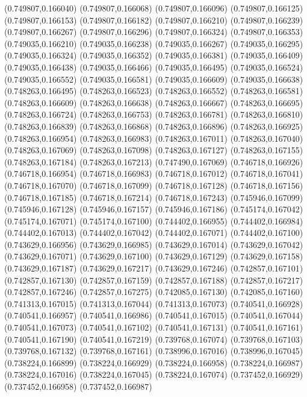 (0.749807,0.166040)
(0.749807,0.166068)
(0.749807,0.166096)
(0.749807,0.166125)
(0.749807,0.166153)
(0.749807,0.166182)
(0.749807,0.166210)
(0.749807,0.166239)
(0.749807,0.166267)
(0.749807,0.166296)
(0.749807,0.166324)
(0.749807,0.166353)
(0.749035,0.166210)
(0.749035,0.166238)
(0.749035,0.166267)
(0.749035,0.166295)
(0.749035,0.166324)
(0.749035,0.166352)
(0.749035,0.166381)
(0.749035,0.166409)
(0.749035,0.166438)
(0.749035,0.166466)
(0.749035,0.166495)
(0.749035,0.166524)
(0.749035,0.166552)
(0.749035,0.166581)
(0.749035,0.166609)
(0.749035,0.166638)
(0.748263,0.166495)
(0.748263,0.166523)
(0.748263,0.166552)
(0.748263,0.166581)
(0.748263,0.166609)
(0.748263,0.166638)
(0.748263,0.166667)
(0.748263,0.166695)
(0.748263,0.166724)
(0.748263,0.166753)
(0.748263,0.166781)
(0.748263,0.166810)
(0.748263,0.166839)
(0.748263,0.166868)
(0.748263,0.166896)
(0.748263,0.166925)
(0.748263,0.166954)
(0.748263,0.166983)
(0.748263,0.167011)
(0.748263,0.167040)
(0.748263,0.167069)
(0.748263,0.167098)
(0.748263,0.167127)
(0.748263,0.167155)
(0.748263,0.167184)
(0.748263,0.167213)
(0.747490,0.167069)
(0.746718,0.166926)
(0.746718,0.166954)
(0.746718,0.166983)
(0.746718,0.167012)
(0.746718,0.167041)
(0.746718,0.167070)
(0.746718,0.167099)
(0.746718,0.167128)
(0.746718,0.167156)
(0.746718,0.167185)
(0.746718,0.167214)
(0.746718,0.167243)
(0.745946,0.167099)
(0.745946,0.167128)
(0.745946,0.167157)
(0.745946,0.167186)
(0.745174,0.167042)
(0.745174,0.167071)
(0.745174,0.167100)
(0.744402,0.166955)
(0.744402,0.166984)
(0.744402,0.167013)
(0.744402,0.167042)
(0.744402,0.167071)
(0.744402,0.167100)
(0.743629,0.166956)
(0.743629,0.166985)
(0.743629,0.167014)
(0.743629,0.167042)
(0.743629,0.167071)
(0.743629,0.167100)
(0.743629,0.167129)
(0.743629,0.167158)
(0.743629,0.167187)
(0.743629,0.167217)
(0.743629,0.167246)
(0.742857,0.167101)
(0.742857,0.167130)
(0.742857,0.167159)
(0.742857,0.167188)
(0.742857,0.167217)
(0.742857,0.167246)
(0.742857,0.167275)
(0.742085,0.167130)
(0.742085,0.167160)
(0.741313,0.167015)
(0.741313,0.167044)
(0.741313,0.167073)
(0.740541,0.166928)
(0.740541,0.166957)
(0.740541,0.166986)
(0.740541,0.167015)
(0.740541,0.167044)
(0.740541,0.167073)
(0.740541,0.167102)
(0.740541,0.167131)
(0.740541,0.167161)
(0.740541,0.167190)
(0.740541,0.167219)
(0.739768,0.167074)
(0.739768,0.167103)
(0.739768,0.167132)
(0.739768,0.167161)
(0.738996,0.167016)
(0.738996,0.167045)
(0.738224,0.166899)
(0.738224,0.166929)
(0.738224,0.166958)
(0.738224,0.166987)
(0.738224,0.167016)
(0.738224,0.167045)
(0.738224,0.167074)
(0.737452,0.166929)
(0.737452,0.166958)
(0.737452,0.166987)
